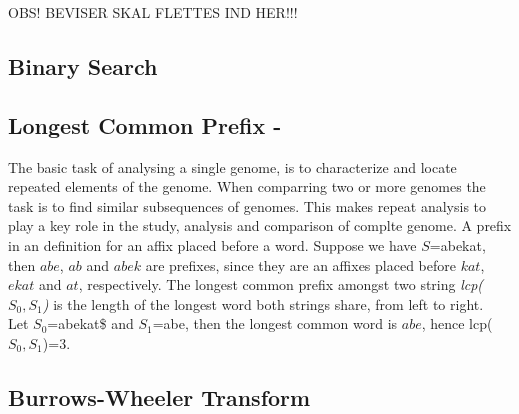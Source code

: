 \documentclass[12pt]{article} %
\begin{document}
OBS! BEVISER SKAL FLETTES IND HER!!! 

\subsection{Binary Search} \label{Binary Search Section}

\subsection{Longest Common Prefix - } \label{LCPsection}

The basic task of analysing a single genome, is to characterize and locate repeated elements of the genome. When comparring two or more genomes the task is to find similar subsequences of genomes. This makes repeat analysis to play a key role in the study, analysis and comparison of complte genome. 
A prefix in an definition for an affix placed before a word. Suppose we have $S$=abekat, then $abe$, $ab$ and $abek$ are prefixes, since they are an affixes placed before $kat$, $ekat$ and $at$, respectively. The longest common prefix amongst two string \emph{lcp($S_0, S_1$)} is the length of the longest word both strings share, from left to right. \\
Let $S_0$=abekat\$ and $S_1$=abe, then the longest common word is $abe$, hence lcp($S_0, S_1$)=3.

\subsection{Burrows-Wheeler Transform} \label{Burrows-Wheeler Transform}
\end{document}
